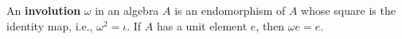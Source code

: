 An \textbf{involution} $\omega$ in an algebra $A$ is an endomorphism of $A$ whose square is the identity map, i.e., $\omega^2 = \iota$. If $A$ has a unit element $e$, then $\omega e = e$.
